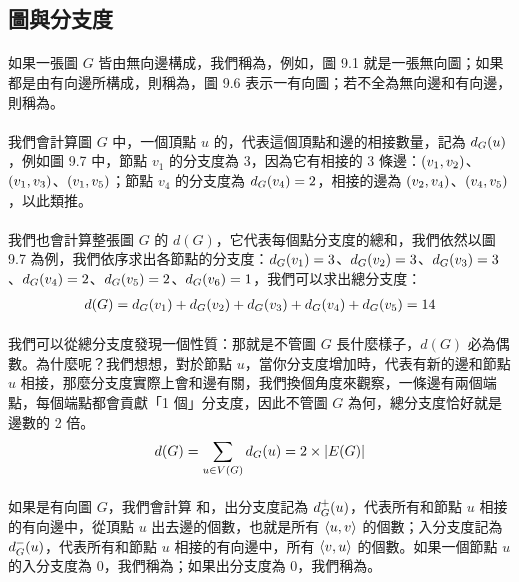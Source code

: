 \documentclass[12pt,a4paper,oneside]{report}
\begin{document}
\begin{CJK}{UTF8}{bkai}
\subsection{圖與分支度}
\paragraph{}如果一張圖 $G$ 皆由無向邊構成，我們稱為\textbf{}，例如，圖 9.1 就是一張無向圖；如果都是由有向邊所構成，則稱為\textbf{}，圖 9.6 表示一有向圖；若不全為無向邊和有向邊，則稱為。
\paragraph{}我們會計算圖 $G$ 中，一個頂點 $u$ 的\textbf{}，代表這個頂點和邊的相接數量，記為 $d_{G}{(u)}$，例如圖 9.7 中，節點 $v_1$ 的分支度為 3，因為它有相接的 3 條邊：$({v_1},{v_2})$、$({v_1},{v_3})$、$({v_1},{v_5})$；節點 $v_4$ 的分支度為 $d_{G}{(v_4)}=2$，相接的邊為 $({v_2},{v_4})$、$({v_4},{v_5})$，以此類推。
\paragraph{}我們也會計算整張圖 $G$ 的\textbf{} $d(G)$，它代表每個點分支度的總和，我們依然以圖 9.7 為例，我們依序求出各節點的分支度：$d_{G}{(v_1)}=3$、$d_{G}{(v_2)}=3$、$d_{G}{(v_3)}=3$、$d_{G}{(v_4)}=2$、$d_{G}{(v_5)}=2$、$d_{G}{(v_6)}=1$，我們可以求出總分支度：
\begin{align*}
d(G)=d_{G}{(v_1)}+d_{G}{(v_2)}+d_{G}{(v_3)}+d_{G}{(v_4)}+d_{G}{(v_5)}=14
\end{align*}
\paragraph{}我們可以從總分支度發現一個性質：那就是不管圖 $G$ 長什麼樣子，$d(G)$ 必為偶數。為什麼呢？我們想想，對於節點 $u$，當你分支度增加時，代表有新的邊和節點 $u$ 相接，那麼分支度實際上會和邊有關，我們換個角度來觀察，一條邊有兩個端點，每個端點都會貢獻「1 個」分支度，因此不管圖 $G$ 為何，總分支度恰好就是邊數的 2 倍。
\begin{align}
\label{eq-degree-twice-edges}
d(G)=\sum_{u\in{V(G)}}{d_{G}{(u)}}=2\times{|E(G)|}
\end{align}
\paragraph{}如果是有向圖 $G$，我們會計算\textbf{} 和\textbf{}，出分支度記為 $d^{+}_{G}{(u)}$，代表所有和節點 $u$ 相接的有向邊中，從頂點 $u$ 出去邊的個數，也就是所有 $\langle{}{{u},{v}}\rangle{}$ 的個數；入分支度記為 $d^{-}_{G}{(u)}$，代表所有和節點 $u$ 相接的有向邊中，所有 $\langle{}{{v},{u}}\rangle{}$ 的個數。如果一個節點 $u$ 的入分支度為 0，我們稱為\textbf{}；如果出分支度為 0，我們稱為\textbf{}。

\end{CJK}
\end{document}
